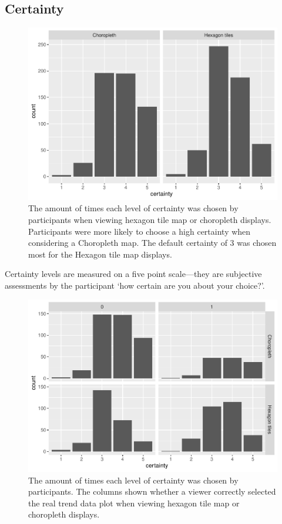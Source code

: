 \documentclass[conference,final,]{IEEEtran}
\makeatletter
\def\maxwidth{\ifdim\Gin@nat@width>\linewidth\linewidth
\else\Gin@nat@width\fi}
\let\Oldincludegraphics\includegraphics
\renewcommand{\includegraphics}[1]{\Oldincludegraphics[width=\maxwidth]{#1}}
\makeatother
\begin{document}
\hypertarget{certainty}{%
\subsection{Certainty}\label{certainty}}

\begin{figure}
\centering
\includegraphics{paper_files/figure-latex/unnamed-chunk-1-1.pdf}
\caption{The amount of times each level of certainty was chosen by
participants when viewing hexagon tile map or choropleth displays.
Participants were more likely to choose a high certainty when
considering a Choropleth map. The default certainty of 3 was chosen most
for the Hexagon tile map displays.}
\end{figure}

Certainty levels are measured on a five point scale---they are
subjective assessments by the participant `how certain are you about
your choice?'.

\begin{figure}
\centering
\includegraphics{paper_files/figure-latex/unnamed-chunk-2-1.pdf}
\caption{The amount of times each level of certainty was chosen by
participants. The columns shown whether a viewer correctly selected the
real trend data plot when viewing hexagon tile map or choropleth
displays.}
\end{figure}
\end{document}
